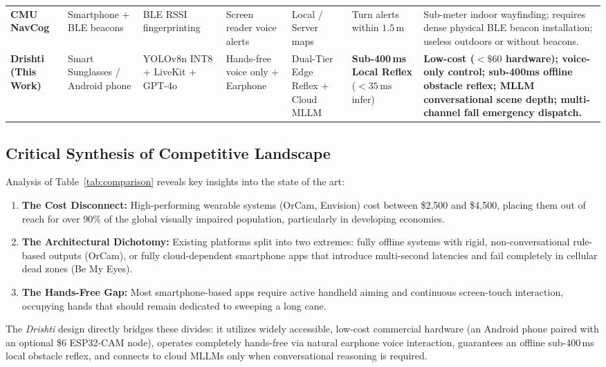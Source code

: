 \documentclass[10pt,twocolumn]{article}
\begin{document}
\begin{table}[t]
\begin{tabularx}{\textwidth}{l p{2.2cm} p{2.0cm} p{2.0cm} p{2.2cm} p{2.4cm} X}
\addlinespace
\textbf{CMU NavCog} \cite{sato2017navcog} & Smartphone + BLE beacons & BLE RSSI fingerprinting & Screen reader voice alerts & Local / Server maps & Turn alerts within $1.5\,\text{m}$ & Sub-meter indoor wayfinding; requires dense physical BLE beacon installation; useless outdoors or without beacons. \\
\addlinespace
\textbf{Drishti (This Work)} & Smart Sunglasses / Android phone & YOLOv8n INT8 + LiveKit + GPT-4o & Hands-free voice only + Earphone & Dual-Tier Edge Reflex + Cloud MLLM & \textbf{Sub-400\,ms Local Reflex} ($<35\,\text{ms}$ infer) & \textbf{Low-cost ($<\$60$ hardware); voice-only control; sub-400ms offline obstacle reflex; MLLM conversational scene depth; multi-channel fall emergency dispatch.} \\
\bottomrule
\end{tabularx}
\end{table}

\subsection{Critical Synthesis of Competitive Landscape}
Analysis of Table~\ref{tab:comparison} reveals key insights into the state of the art:
\begin{enumerate}[leftmargin=*]
    \item \textbf{The Cost Disconnect:} High-performing wearable systems (OrCam, Envision) cost between \$2,500 and \$4,500, placing them out of reach for over 90\% of the global visually impaired population, particularly in developing economies.
    \item \textbf{The Architectural Dichotomy:} Existing platforms split into two extremes: fully offline systems with rigid, non-conversational rule-based outputs (OrCam), or fully cloud-dependent smartphone apps that introduce multi-second latencies and fail completely in cellular dead zones (Be My Eyes).
    \item \textbf{The Hands-Free Gap:} Most smartphone-based apps require active handheld aiming and continuous screen-touch interaction, occupying hands that should remain dedicated to sweeping a long cane.
\end{enumerate}

The \textit{Drishti} design directly bridges these divides: it utilizes widely accessible, low-cost commercial hardware (an Android phone paired with an optional \$6 ESP32-CAM node), operates completely hands-free via natural earphone voice interaction, guarantees an offline sub-400\,ms local obstacle reflex, and connects to cloud MLLMs only when conversational reasoning is required.
\end{document}
